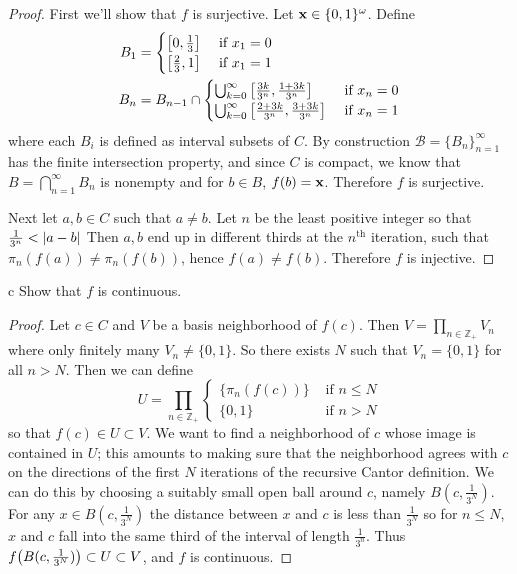 \documentclass[11pt]{article}
\begin{document}
\begin{proof}
  First we'll show that $f$ is surjective. Let $\vb x \in \{0, 1\}^\omega$.
  Define
  \begin{align*}
    B_1 &=
    \begin{cases}
      \qty[0, \frac{1}{3}] &\text{ if } x_1 = 0 \\
      \qty[\frac{2}{3}, 1] &\text{ if } x_1 = 1
    \end{cases} \\
    B_n &= B_{n-1} \cap
    \begin{cases}
      \bigcup_{k = 0}^\infty \qty[\frac{3k}{3^n}, \frac{1 + 3k}{3^n}] &\text{ if } x_n = 0 \\
      \bigcup_{k = 0}^\infty \qty[\frac{2 + 3k}{3^n}, \frac{3 + 3k}{3^n}] &\text{ if } x_n = 1
    \end{cases}
  \end{align*}
  where each $B_i$ is defined as interval subsets of $C$. By construction
  $\mathcal{B} = \{B_n\}_{n=1}^\infty$ has the finite
  intersection property, and since $C$ is compact, we know that $B =
  \bigcap_{n=1}^\infty B_n$ is nonempty and for $b \in B$, $f(b) = \vb x$.
  Therefore $f$ is surjective.

  Next let $a, b \in C$ such that $a \neq b$. Let $n$ be the least positive
  integer so that $\frac{1}{3^n} < \abs{a - b}$ Then $a, b$ end up in different
  thirds at the $n^{\text{th}}$ iteration, such that $\pi_n(f(a)) \neq
  \pi_n(f(b))$, hence $f(a) \neq f(b)$. Therefore $f$ is injective.
\end{proof}

\begin{p}{c}
  Show that $f$ is continuous.
\end{p}

\begin{proof}
  Let $c \in C$ and $V$ be a basis neighborhood of $f(c)$. Then $V = \prod_{n \in
  \mathbb{Z}_+} V_n$ where only finitely many $V_n \neq \{0, 1\}$. So there
  exists $N$ such that $V_n = \{0, 1\}$ for all $n > N$. Then we can define
  \[ U = \prod_{n \in \mathbb{Z}_+}
    \begin{cases}
      \{\pi_n(f(c))\} &\text{ if } n \leq N \\
      \{0, 1\} &\text{ if } n > N
    \end{cases}
  \]
  so that $f(c) \in U \subset V$. We want to find a neighborhood of $c$ whose
  image is contained in $U$; this amounts to making sure that the neighborhood
  agrees with $c$ on the directions of the first $N$ iterations of the recursive
  Cantor definition. We can do this by choosing a suitably small open ball
  around $c$, namely $B(c, \frac{1}{3^N})$. For any $x \in B(c, \frac{1}{3^N})$ the
  distance between $x$ and $c$ is less than $\frac{1}{3^N}$ so for $n \leq N$,
  $x$ and $c$ fall into the same third of the interval of length $\frac{1}{3^n}$. Thus
  $f\qty(B(c, \frac{1}{3^N})) \subset U \subset V$, and $f$ is continuous.
\end{proof}
\end{document}
